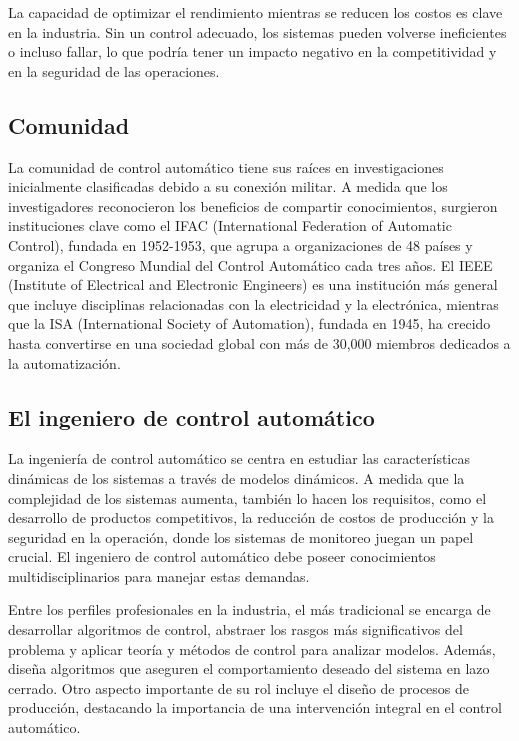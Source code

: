 \documentclass[journal, table]{IEEEtran}
\begin{document}
La capacidad de optimizar el rendimiento mientras se reducen los costos es
clave en la industria.
Sin un control adecuado, los sistemas pueden volverse ineficientes o incluso
fallar, lo que podría tener un impacto negativo en la competitividad y en la
seguridad de las operaciones.

\subsection{Comunidad}%
\label{sub:Comunidad}

La comunidad de control automático tiene sus raíces en investigaciones
inicialmente clasificadas debido a su conexión militar.
A medida que los investigadores reconocieron los beneficios de compartir
conocimientos, surgieron instituciones clave como el IFAC (International
Federation of Automatic Control), fundada en 1952-1953, que agrupa a
organizaciones de 48 países y organiza el Congreso Mundial del Control
Automático cada tres años.
El IEEE (Institute of Electrical and Electronic Engineers) es una institución
más general que incluye disciplinas relacionadas con la electricidad y la
electrónica, mientras que la ISA (International Society of Automation), fundada
en 1945, ha crecido hasta convertirse en una sociedad global con más de 30,000
miembros dedicados a la automatización.

\subsection{El ingeniero de control automático}%
\label{sub:El ingeniero de control automático}

La ingeniería de control automático se centra en estudiar las características
dinámicas de los sistemas a través de modelos dinámicos.
A medida que la complejidad de los sistemas aumenta, también lo hacen los
requisitos, como el desarrollo de productos competitivos, la reducción de
costos de producción y la seguridad en la operación, donde los sistemas de
monitoreo juegan un papel crucial.
El ingeniero de control automático debe poseer conocimientos multidisciplinarios
para manejar estas demandas.

Entre los perfiles profesionales en la industria, el más tradicional se encarga
de desarrollar algoritmos de control, abstraer los rasgos más significativos
del problema y aplicar teoría y métodos de control para analizar modelos.
Además, diseña algoritmos que aseguren el comportamiento deseado del sistema en
lazo cerrado.
Otro aspecto importante de su rol incluye el diseño de procesos de producción,
destacando la importancia de una intervención integral en el control automático.
\end{document}

